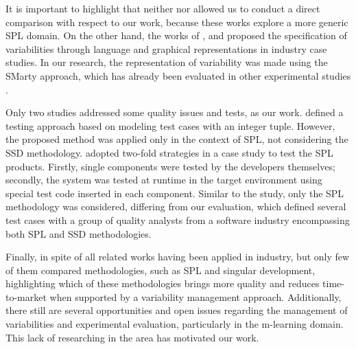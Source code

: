

It is important to highlight that neither \cite{gamez14} nor \cite{marinho10} allowed us to conduct a direct comparison with respect to our work, because these works explore a more generic SPL domain. On the other hand, the works of \cite{hubaux10}, \cite{eriksson09} and \cite{ardis00} proposed the specification of variabilities through language and graphical representations in industry case studies. In our research, the representation of variability was made using the  SMarty approach, which has already been evaluated in other experimental studies \cite{marcolino13,marcolino14a,marcolino14b,bera15,marcolino2017}.

Only two studies addressed some quality issues and tests, as our work. \cite{ardis00} defined a testing approach based on modeling test cases with an integer tuple. However, the proposed method was applied only in the context of SPL, not considering the SSD methodology. \cite{gacek01} adopted two-fold strategies in a case study to test the SPL products. Firstly, single components were tested by the developers themselves; secondly, the system was tested at runtime in the target environment using special test code inserted in each component. Similar to the \cite{ardis00} study, only the SPL methodology was considered, differing from our evaluation, which defined several test cases with a group of quality analysts from a software industry encompassing both SPL and SSD methodologies.

Finally, in spite of all related works having been applied in industry, but only few of them compared methodologies, such as SPL and singular development, highlighting which of these methodologies brings more quality and reduces time-to-market when supported by a variability management approach. Additionally, there still are several opportunities and open issues regarding the management of variabilities and experimental evaluation, particularly in the m-learning domain. This lack of researching in the area has motivated our work.